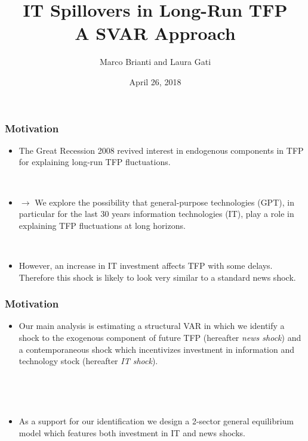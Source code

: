 \documentclass{beamer}
\author[Brianti, Gati]{Marco Brianti and Laura Gati}
\institute[Boston College]{Boston College}
\title{IT Spillovers in Long-Run TFP \\ A SVAR Approach}
\date{April 26, 2018}
\begin{document}
\begin{frame}

\maketitle


\end{frame}


\begin{frame}
	\frametitle{Motivation}
	
	\begin{itemize}
	
	\item The Great Recession 2008 revived interest in endogenous components in TFP for explaining long-run TFP fluctuations.
	
	\
	
	\item[] $\rightarrow$ We explore the possibility that general-purpose technologies (GPT), in particular for the last 30 years information technologies (IT), play a role in explaining TFP fluctuations at long horizons. 
	
	\
	
	\item However, an increase in IT investment affects TFP with some delays. Therefore this shock is likely to look very similar to a standard news shock.
	
	\end{itemize} 

\end{frame}

\begin{frame}
	\frametitle{Motivation}
	
	\begin{itemize}
	\item Our main analysis is estimating a structural VAR in which we identify a shock to the exogenous component of future TFP (hereafter \textit{news shock}) and a contemporaneous shock which incentivizes investment in information and technology stock (hereafter \textit{IT shock}).
	
	\
	
	\
	
	
    \item As a support for our identification we design a 2-sector general equilibrium model which features both investment in IT and news shocks.
	
	\end{itemize} 

\end{frame}
\end{document}
